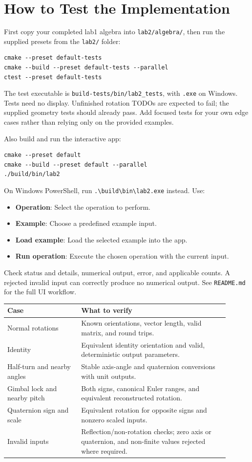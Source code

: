 \documentclass[11pt,a4paper]{article}
\begin{document}
\section*{How to Test the Implementation}

First copy your completed lab1 algebra into \texttt{lab2/algebra/}, then run
the supplied presets from the \texttt{lab2/} folder:
\begin{verbatim}
cmake --preset default-tests
cmake --build --preset default-tests --parallel
ctest --preset default-tests
\end{verbatim}

The test executable is \texttt{build-tests/bin/lab2\_tests}, with
\texttt{.exe} on Windows. Tests need no display. Unfinished rotation TODOs are
expected to fail; the supplied geometry tests should already pass.
Add focused tests for your own edge cases rather than relying only on the
provided examples.

Also build and run the interactive app:
\begin{verbatim}
cmake --preset default
cmake --build --preset default --parallel
./build/bin/lab2
\end{verbatim}

On Windows PowerShell, run \verb|.\build\bin\lab2.exe| instead.
Use:
\begin{itemize}[leftmargin=*]
\item \textbf{Operation}: Select the operation to perform.
\item \textbf{Example}: Choose a predefined example input.
\item \textbf{Load example}: Load the selected example into the app.
\item \textbf{Run operation}: Execute the chosen operation with the current input.
\end{itemize}

Check status and details, numerical output, error,
and applicable counts. A rejected invalid input can correctly produce no
numerical output. See \texttt{README.md} for the full UI workflow.

\begin{center}
\begin{tabular}{L{0.30\linewidth}L{0.60\linewidth}}
\toprule
\textbf{Case} & \textbf{What to verify}\\
\midrule
Normal rotations & Known orientations, vector length, valid matrix, and round trips.\\
Identity & Equivalent identity orientation and valid, deterministic output parameters.\\
Half-turn and nearby angles & Stable axis-angle and quaternion conversions with unit outputs.\\
Gimbal lock and nearby pitch & Both signs, canonical Euler ranges, and equivalent reconstructed rotation.\\
Quaternion sign and scale & Equivalent rotation for opposite signs and nonzero scaled inputs.\\
Invalid inputs & Reflection/non-rotation checks; zero axis or quaternion, and non-finite values rejected where required.\\
\bottomrule
\end{tabular}
\end{center}
\end{document}
